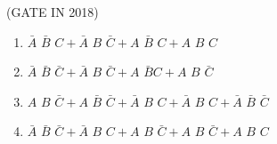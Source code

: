 \begin{enumerate}[label=\arabic*.,ref=\theenumi]
\hfill (GATE IN 2018)
  \begin{enumerate}[label=(\Alph*)]                               
	  \item $\bar{A}\hspace{4pt}\bar{B}\hspace{4pt}C+ \bar{A}\hspace{4pt}B\hspace{4pt}\bar{C} + A\hspace{4pt}\bar{B}\hspace{4pt}C + A\hspace{4pt}B\hspace{4pt}C$
	  \item $\bar{A}\hspace{4pt}\bar{B}\hspace{4pt}\bar{C} + \bar{A}\hspace{4pt}B\hspace{4pt}\bar{C} + A\hspace{4pt}\bar{B} C + A\hspace{4pt}B\hspace{4pt}\bar{C}$
	  \item $A\hspace{4pt}B\hspace{4pt} \bar{C} + A\hspace{4pt}\bar{B}\hspace{4pt}\bar{C} + \bar{A}\hspace{4pt}B\hspace{4pt}C + \bar{A}\hspace{4pt}B\hspace{4pt}C + \bar{A}\hspace{4pt}\bar{B}\hspace{4pt}\bar{C}$
	  \item $\bar{A}\hspace{4pt}\bar{B}\hspace{4pt}\bar{C} + \bar{A}\hspace{4pt}B\hspace{4pt}C +A\hspace{4pt}B\hspace{4pt}\bar{C} + A\hspace{4pt}B\hspace{4pt}\bar{C}+ A\hspace{4pt}B\hspace{4pt}C$
\end{enumerate}



\end{enumerate}

